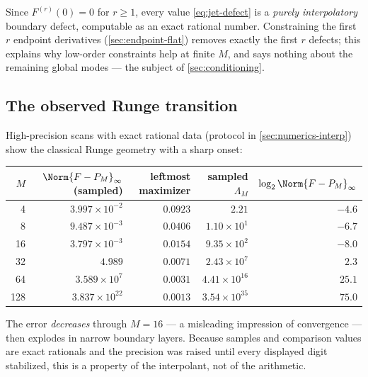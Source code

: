 \documentclass[11pt,oneside]{article}
\numberwithin{equation}{section}
\theoremstyle{definition}
\theoremstyle{remark}
\begin{document}
Since $F^{(r)}(0)=0$ for $r\ge1$, every value
\eqref{eq:jet-defect} is a \emph{purely interpolatory} boundary
defect, computable as an exact rational number.  Constraining the
first $r$ endpoint derivatives (\cref{sec:endpoint-flat}) removes
exactly the first $r$ defects; this explains why low-order constraints
help at finite $M$, and says nothing about the remaining global modes
--- the subject of \cref{sec:conditioning}.

\subsection{The observed Runge transition}
\label{sec:ordinary-numerics}

High-precision scans with exact rational data (protocol in
\cref{sec:numerics-interp}) show the classical Runge geometry with a
sharp onset:

\begin{center}
\small
\begin{tabular}{rrrrr}
\toprule
$M$ & $\Norm{F-P_M}_\infty$ (sampled) & leftmost maximizer &
sampled $\Lambda_M$ & $\log_2\Norm{F-P_M}_\infty$ \\
\midrule
4   & $3.997\times10^{-2}$ & $0.0923$ & $2.21$ & $-4.6$ \\
8   & $9.487\times10^{-3}$ & $0.0406$ & $1.10\times10^{1}$ & $-6.7$ \\
16  & $3.797\times10^{-3}$ & $0.0154$ & $9.35\times10^{2}$ & $-8.0$ \\
32  & $4.989$              & $0.0071$ & $2.43\times10^{7}$ & $2.3$ \\
64  & $3.589\times10^{7}$  & $0.0031$ & $4.41\times10^{16}$ & $25.1$ \\
128 & $3.837\times10^{22}$ & $0.0013$ & $3.54\times10^{35}$ & $75.0$ \\
\bottomrule
\end{tabular}
\label{tab:ordinary-errors}
\end{center}

The error \emph{decreases} through $M=16$ --- a misleading impression
of convergence --- then explodes in narrow boundary layers.  Because
samples and comparison values are exact rationals and the precision
was raised until every displayed digit stabilized, this is a property
of the interpolant, not of the arithmetic.
\end{document}
